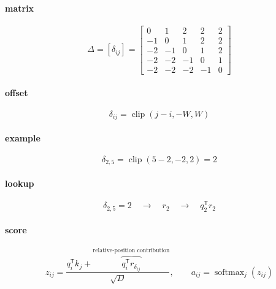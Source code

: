 \documentclass{article}
\begin{document}
\paragraph{matrix}
\[
\Delta=[\delta_{ij}]=\begin{bmatrix}0&1&2&2&2\\-1&0&1&2&\boxed{2}\\-2&-1&0&1&2\\-2&-2&-1&0&1\\-2&-2&-2&-1&0\end{bmatrix}
\]

\paragraph{offset}
\[
\delta_{ij}=\operatorname{clip}(j-i,-W,W)
\]

\paragraph{example}
\[
\delta_{2,5}=\operatorname{clip}(5-2,-2,2)=2
\]

\paragraph{lookup}
\[
\delta_{2,5}=2\quad\longrightarrow\quad r_2\quad\longrightarrow\quad q_2^{\mathsf T}r_2
\]

\paragraph{score}
\[
z_{ij}=\frac{q_i^{\mathsf T}k_j+\overbrace{q_i^{\mathsf T}r_{\delta_{ij}}}^{\text{relative-position contribution}}}{\sqrt{D}},\qquad a_{ij}=\operatorname{softmax}_j(z_{ij})
\]
\end{document}
